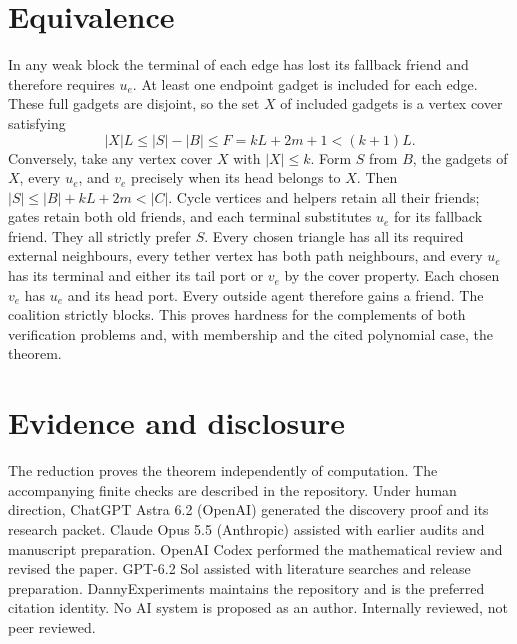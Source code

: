 \documentclass[11pt,a4paper]{amsart}
\begin{document}
\section{Equivalence}
In any weak block the terminal of each edge has lost its fallback friend and therefore requires $u_e$. At least one endpoint gadget is included for each edge. These full gadgets are disjoint, so the set $X$ of included gadgets is a vertex cover satisfying
\[
 |X|L\le |S|-|B|\le F=kL+2m+1<(k+1)L .
\]
Conversely, take any vertex cover $X$ with $|X|\le k$. Form $S$ from $B$, the gadgets of $X$, every $u_e$, and $v_e$ precisely when its head belongs to $X$. Then $|S|\le |B|+kL+2m<|C|$. Cycle vertices and helpers retain all their friends; gates retain both old friends, and each terminal substitutes $u_e$ for its fallback friend. They all strictly prefer $S$. Every chosen triangle has all its required external neighbours, every tether vertex has both path neighbours, and every $u_e$ has its terminal and either its tail port or $v_e$ by the cover property. Each chosen $v_e$ has $u_e$ and its head port. Every outside agent therefore gains a friend. The coalition strictly blocks. This proves hardness for the complements of both verification problems and, with membership and the cited polynomial case, the theorem.

\section*{Evidence and disclosure}
The reduction proves the theorem independently of computation. The accompanying finite checks are described in the repository. Under human direction, ChatGPT Astra 6.2 (OpenAI) generated the discovery proof and its research packet. Claude Opus 5.5 (Anthropic) assisted with earlier audits and manuscript preparation. OpenAI Codex performed the mathematical review and revised the paper. GPT-6.2 Sol assisted with literature searches and release preparation. DannyExperiments maintains the repository and is the preferred citation identity. No AI system is proposed as an author. Internally reviewed, not peer reviewed.


\end{document}
